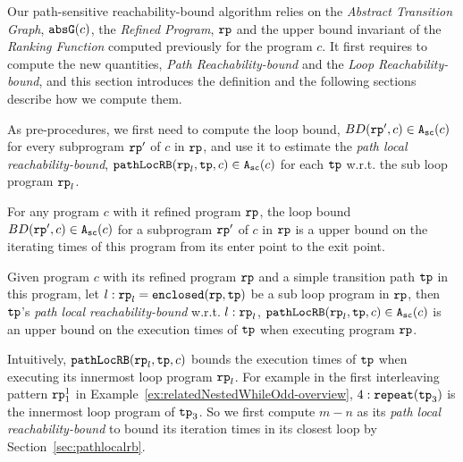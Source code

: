 Our path-sensitive reachability-bound algorithm relies on the \emph{Abstract Transition Graph}, $\mathtt{abs}{\mathtt{G}}(c)$, the \emph{Refined Program}, $\mathtt{rp}$ and the upper bound invariant of the \emph{Ranking Function} computed previously for the program $c$.
It first requires to compute the new quantities, \emph{Path Reachability-bound} and the \emph{Loop Reachability-bound}, and this section introduces the definition and the following sections describe how we compute them.


As pre-procedures, we first need to compute the loop bound, $BD(\mathtt{rp}', c) \in {\ensuremath{\mathtt{A_{sc}}}}(c)$ for every subprogram $\mathtt{rp}'$ of $c$ in $\mathtt{rp}$, and use it to estimate the \emph{path local reachability-bound}, $\mathtt{pathLocRB}(\mathtt{rp}_l, \mathtt{tp}, c) \in {\ensuremath{\mathtt{A_{sc}}}}(c)$ for each $\mathtt{tp}$ w.r.t. the sub loop program $\mathtt{rp}_l$.
\begin{defn}
  For any program $c$ with it refined program $\mathtt{rp}$,
  the loop bound $BD(\mathtt{rp}', c) \in {\ensuremath{\mathtt{A_{sc}}}}(c)$ for a subprogram $\mathtt{rp}'$ of $c$ in $\mathtt{rp}$ is a upper bound on the iterating times of this program from its enter point to the exit point.
\end{defn}
% 
\begin{defn}
  Given program $c$ with its refined program $\mathtt{rp}$ and a simple transition path $\mathtt{tp}$ in this program, 
  let $l: \mathtt{rp}_l = \mathtt{enclosed}(\mathtt{rp}, \mathtt{tp})$ be a sub loop program in $\mathtt{rp}$,
  then $\mathtt{tp}$'s \emph{path local reachability-bound} w.r.t. $l: \mathtt{rp}_l$,  $\mathtt{pathLocRB}(\mathtt{rp}_l, \mathtt{tp}, c) \in {\ensuremath{\mathtt{A_{sc}}}}(c)$
  is an upper bound on the execution times of $\mathtt{tp}$ when executing program $\mathtt{rp}$.
\end{defn}
Intuitively,
$\mathtt{pathLocRB}(\mathtt{rp}_l, \mathtt{tp}, c)$ bounds the execution times of $\mathtt{tp}$ when executing its innermost loop program $\mathtt{rp}_l$.
For example in the first interleaving pattern $\mathtt{rp}_1^1$ in Example~\ref{ex:relatedNestedWhileOdd-overview}, 
$4:\mathtt{repeat}(\mathtt{tp}_3)$ is the innermost loop program of $\mathtt{tp}_3$. So we first compute $m - n$ as its \emph{path local reachability-bound} to bound its iteration times in its closest loop by Section~\ref{sec:pathlocalrb}.


